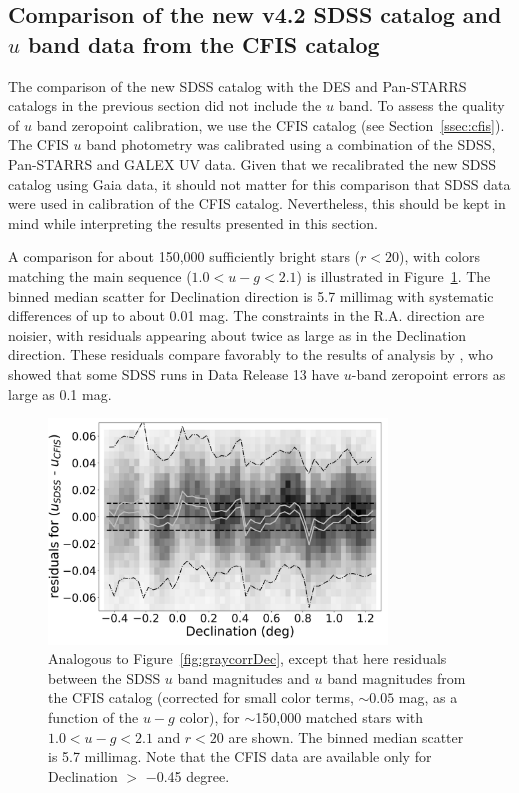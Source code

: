 \documentclass[fleqn,usenatbib]{mnras}
\begin{document}
\subsection{Comparison of the new v4.2 SDSS catalog and $u$ band data from the CFIS catalog  \label{sec:CFIStest}} 

The comparison of the new SDSS catalog with the DES and Pan-STARRS catalogs in the previous
section did not include the $u$ band. To assess the quality of $u$ band zeropoint calibration, 
we use the CFIS catalog (see Section~\ref{ssec:cfis}). The CFIS $u$ band photometry was 
calibrated using a combination of the SDSS, Pan-STARRS and GALEX UV data. Given that
we recalibrated the new SDSS catalog using Gaia data, it should not matter for this comparison that SDSS data were used in calibration of the CFIS catalog. Nevertheless, this should be kept in mind while interpreting the results presented in this section.

A comparison for about 150,000 sufficiently bright stars ($r<20$), with colors matching the main sequence ($1.0 <u-g < 2.1$)  is illustrated in Figure~\ref{fig:CFIS}. The binned median scatter for Declination direction is 
5.7 millimag with systematic differences of up to about 0.01 mag. The constraints in the R.A. direction 
are noisier, with residuals appearing about twice as large as in the Declination direction. 
These residuals compare favorably to the results of analysis by \cite{2017ApJ...848..128I}, 
who showed that some SDSS runs in Data Release 13 have $u$-band zeropoint errors as large
as 0.1 mag. 

 
\begin{figure}[th!]
    \centering\includegraphics[width=9cm]{figures/colorResidCFISug_Dec_Hess.png} 
\caption{Analogous to Figure~\ref{fig:graycorrDec}, except that here residuals 
between the SDSS $u$ band magnitudes and $u$ band magnitudes from the CFIS
catalog (corrected for small color terms, $\sim0.05$ mag, as a function of the $u-g$ color),
for $\sim$150,000 matched stars with $1.0 <u-g < 2.1$ and $r<20$ are shown. 
The binned median scatter is 5.7 millimag. Note that the CFIS data are available
only for Declination $>$ $-$0.45 degree.}
\label{fig:CFIS}
\end{figure}
\end{document}
